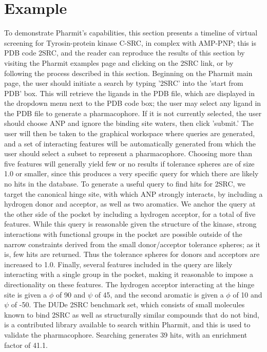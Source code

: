 \section{Example}

To demonstrate Pharmit's capabilities, this section presents a timeline of virtual screening for Tyrosin-protein kinase C-SRC, in complex with AMP-PNP; this is PDB code 2SRC, and the reader can reproduce the results of this section by visiting the Pharmit examples page and clicking on the 2SRC link, or by following the process described in this section.  Beginning on the Pharmit main page, the user should initiate a search by typing '2SRC' into the 'start from PDB' box. This will retrieve the ligands in the PDB file, which are displayed in the dropdown menu next to the PDB code box; the user may select any ligand in the PDB file to generate a pharmacophore. If it is not currently selected, the user should choose ANP and ignore the binding site waters, then click 'submit.' The user will then be taken to the graphical workspace where queries are generated, and a set of interacting features will be automatically generated from which the user should select a subset to represent a pharmacophore. Choosing more than five features will generally yield few or no results if tolerance spheres are of size 1.0 or smaller, since this produces a very specific query for which there are likely no hits in the database. To generate a useful query to find hits for 2SRC, we target the canonical hinge site, with which ANP strongly interacts, by including a hydrogen donor and acceptor, as well as two aromatics. We anchor the query at the other side of the pocket by including a hydrogen acceptor, for a total of five features. While this query is reasonable given the structure of the kinase, strong interactions with functional groups in the pocket are possible outside of the narrow constraints derived from the small donor/acceptor tolerance spheres; as it is, few hits are returned. Thus the tolerance spheres for donors and acceptors are increased to 1.0. Finally, several features included in the query are likely interacting with a single group in the pocket, making it reasonable to impose a directionality on these features. The hydrogen acceptor interacting at the hinge site is given a $\phi$ of 90 and $\psi$ of 45, and the second aromatic is given a $\phi$ of 10 and $\psi$ of -50. The DUDe 2SRC benchmark set, which consists of small molecules known to bind 2SRC as well as structurally similar compounds that do not bind, is a contributed library available to search within Pharmit, and this is used to validate the pharmacophore. Searching generates 39 hits, with an enrichment factor of 41.1. 